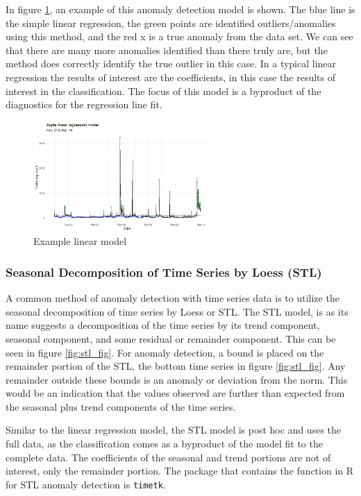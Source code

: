 \documentclass{article}
\begin{document}
In figure \ref{fig:lm_fig}, an example of this anomaly detection model is shown. The blue line is the simple linear regression, the green points are identified outliers/anomalies using this method, and the red x is a true anomaly from the data set. We can see that there are many more anomalies identified than there truly are, but the method does correctly identify the true outlier in this case. In a typical linear regression the results of interest are the coefficients, in this case the results of interest in the classification. The focus of this model is a byproduct of the diagnostics for the regression line fit.

\begin{figure}[!ht]
    \centering
    \includegraphics[width=0.6\textwidth]{linear_model.png}
    \caption{Example linear model}
    \label{fig:lm_fig}
\end{figure}

\subsubsection{Seasonal Decomposition of Time Series by Loess (STL)}
A common method of anomaly detection with time series data is to utilize the seasonal decomposition of time series by Loess or STL. The STL model, is as its name suggests a decomposition of the time series by its trend component, seasonal component, and some residual or remainder component. This can be seen in figure \ref{fig:stl_fig}. For anomaly detection, a bound is placed on the remainder portion of the STL, the bottom time series in figure \ref{fig:stl_fig}. Any remainder outside these bounds is an anomaly or deviation from the norm. This would be an indication that the values observed are further than expected from the seasonal plus trend components of the time series.

Similar to the linear regression model, the STL model is post hoc and uses the full data, as the classification comes as a byproduct of the model fit to the complete data. The coefficients of the seasonal and trend portions are not of interest, only the remainder portion. The package that contains the function in R for STL anomaly detection is \texttt{timetk}.
\end{document}
